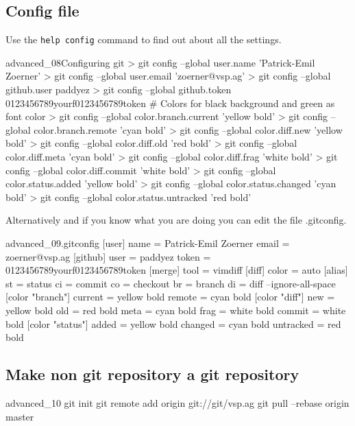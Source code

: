 \subsection{Config file}
Use the \texttt{help config} command to find out about all the settings.
\begin{codelisting}{advanced_08}{Configuring git}
> git config --global user.name 'Patrick-Emil Zoerner'
> git config --global user.email 'zoerner@vsp.ag'
> git config --global github.user paddyez
> git config --global github.token 0123456789yourf0123456789token
# Colors for black background and green as font color
> git config --global color.branch.current 'yellow bold'
> git config --global color.branch.remote 'cyan bold'
> git config --global color.diff.new 'yellow bold'
> git config --global color.diff.old 'red bold'
> git config --global color.diff.meta 'cyan bold'
> git config --global color.diff.frag 'white bold'
> git config --global color.diff.commit 'white bold'
> git config --global color.status.added 'yellow bold'
> git config --global color.status.changed 'cyan bold'
> git config --global color.status.untracked 'red bold'
\end{codelisting}
Alternatively and if you know what you are doing you can edit the file .gitconfig.
\begin{codelisting}{advanced_09}{.gitconfig}
[user]
        name = Patrick-Emil Zoerner
        email = zoerner@vsp.ag
[github]
        user = paddyez
        token = 0123456789yourf0123456789token
[merge]
        tool = vimdiff
[diff]
        color = auto
[alias]
        st = status
        ci = commit
        co = checkout
        br = branch
        di = diff --ignore-all-space
[color "branch"]
        current = yellow bold
        remote = cyan bold
[color "diff"]
        new = yellow bold
        old = red bold
        meta = cyan bold
        frag = white bold
        commit = white bold
[color "status"]
        added = yellow bold
        changed = cyan bold
        untracked = red bold
\end{codelisting}
\subsection{Make non git repository a git repository}
\begin{codelisting}{advanced_10}{}
git init
git remote add origin git://git/vsp.ag
git pull --rebase origin master
\end{codelisting}
